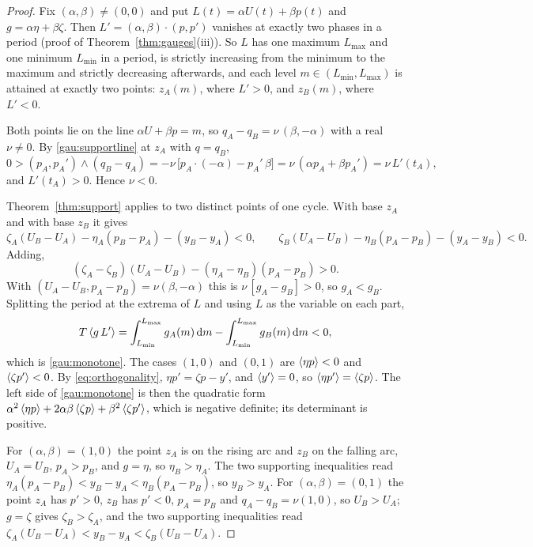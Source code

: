 \begin{proof}
Fix $(\alpha,\beta)\ne(0,0)$ and put $L(t)=\alpha U(t)+\beta p(t)$ and $g=\alpha\eta+\beta\zeta$. Then $L'=(\alpha,\beta)\cdot(p,p')$ vanishes at exactly two phases in a period (proof of Theorem~\ref{thm:gauges}(iii)). So $L$ has one maximum $L_{\max}$ and one minimum $L_{\min}$ in a period, is strictly increasing from the minimum to the maximum and strictly decreasing afterwards, and each level $m\in(L_{\min},L_{\max})$ is attained at exactly two points: $z_A(m)$, where $L'>0$, and $z_B(m)$, where $L'<0$.

Both points lie on the line $\alpha U+\beta p=m$, so $q_A-q_B=\nu\,(\beta,-\alpha)$ with a real $\nu\ne0$. By \eqref{gau:supportline} at $z_A$ with $q=q_B$,
\[
0>(p_A,p_A')\wedge(q_B-q_A)=-\nu\,\bigl[p_A\cdot(-\alpha)-p_A'\,\beta\bigr]=\nu\,(\alpha p_A+\beta p_A')=\nu\,L'(t_A),
\]
and $L'(t_A)>0$. Hence $\nu<0$.

Theorem~\ref{thm:support} applies to two distinct points of one cycle. With base $z_A$ and with base $z_B$ it gives
\[
\zeta_A(U_B-U_A)-\eta_A(p_B-p_A)-(y_B-y_A)<0,\qquad
\zeta_B(U_A-U_B)-\eta_B(p_A-p_B)-(y_A-y_B)<0 .
\]
Adding,
\begin{equation}\label{gau:gradientmonotone}
(\zeta_A-\zeta_B)(U_A-U_B)-(\eta_A-\eta_B)(p_A-p_B)>0 .
\end{equation}
With $(U_A-U_B,p_A-p_B)=\nu(\beta,-\alpha)$ this is $\nu\,[g_A-g_B]>0$, so $g_A<g_B$. Splitting the period at the extrema of $L$ and using $L$ as the variable on each part,
\[
T\left\langle g\,L'\right\rangle=\int_{L_{\min}}^{L_{\max}}g_A(m)\,\mathrm dm-\int_{L_{\min}}^{L_{\max}}g_B(m)\,\mathrm dm<0 ,
\]
which is \eqref{gau:monotone}. The cases $(1,0)$ and $(0,1)$ are $\left\langle \eta p\right\rangle<0$ and $\left\langle \zeta p'\right\rangle<0$. By \eqref{eq:orthogonality}, $\eta p'=\zeta p-y'$, and $\left\langle y'\right\rangle=0$, so $\left\langle \eta p'\right\rangle=\left\langle \zeta p\right\rangle$. The left side of \eqref{gau:monotone} is then the quadratic form $\alpha^2\left\langle \eta p\right\rangle+2\alpha\beta\left\langle \zeta p\right\rangle+\beta^2\left\langle \zeta p'\right\rangle$, which is negative definite; its determinant is positive.

For $(\alpha,\beta)=(1,0)$ the point $z_A$ is on the rising arc and $z_B$ on the falling arc, $U_A=U_B$, $p_A>p_B$, and $g=\eta$, so $\eta_B>\eta_A$. The two supporting inequalities read $\eta_A(p_A-p_B)<y_B-y_A<\eta_B(p_A-p_B)$, so $y_B>y_A$. For $(\alpha,\beta)=(0,1)$ the point $z_A$ has $p'>0$, $z_B$ has $p'<0$, $p_A=p_B$ and $q_A-q_B=\nu(1,0)$, so $U_B>U_A$; $g=\zeta$ gives $\zeta_B>\zeta_A$, and the two supporting inequalities read $\zeta_A(U_B-U_A)<y_B-y_A<\zeta_B(U_B-U_A)$.
\end{proof}

